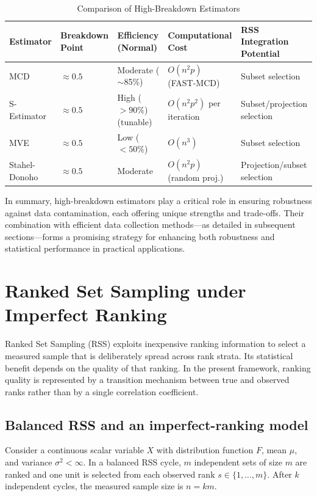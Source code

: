 \documentclass[12pt]{article}
\begin{document}
\begin{table}[H]
\centering
\caption{Comparison of High-Breakdown Estimators}
\label{tab:estimator_comparison}
\begin{tabularx}{\textwidth}{lXXXX}
\toprule
\textbf{Estimator} & \textbf{Breakdown Point} & \textbf{Efficiency (Normal)} & \textbf{Computational Cost} & \textbf{RSS Integration Potential} \\
\midrule
MCD           & $\approx 0.5$ & Moderate ($\sim$85\%)  & $O(n^2p)$ (FAST-MCD)      & Subset selection            \\
S-Estimator   & $\approx 0.5$ & High ($>90\%$) (tunable) & $O(n^2p^2)$ per iteration & Subset/projection selection \\
MVE           & $\approx 0.5$ & Low ($<50\%$)           & $O(n^3)$                  & Subset selection            \\
Stahel-Donoho & $\approx 0.5$ & Moderate                & $O(n^2p)$ (random proj.)  & Projection/subset selection \\
\bottomrule
\end{tabularx}
\end{table}

In summary, high-breakdown estimators play a critical role in ensuring robustness against data contamination, each offering unique strengths and trade-offs. Their combination with efficient data collection methods---as detailed in subsequent sections---forms a promising strategy for enhancing both robustness and statistical performance in practical applications.

\section{Ranked Set Sampling under Imperfect Ranking}
\label{sec:rss}

Ranked Set Sampling (RSS) exploits inexpensive ranking information to select a measured sample that is deliberately spread across rank strata. Its statistical benefit depends on the quality of that ranking. In the present framework, ranking quality is represented by a transition mechanism between true and observed ranks rather than by a single correlation coefficient.

\subsection{Balanced RSS and an imperfect-ranking model}
Consider a continuous scalar variable $X$ with distribution function $F$, mean $\mu$, and variance $\sigma^2<\infty$. In a balanced RSS cycle, $m$ independent sets of size $m$ are ranked and one unit is selected from each observed rank $s\in\{1,\ldots,m\}$. After $k$ independent cycles, the measured sample size is $n=km$.
\end{document}
